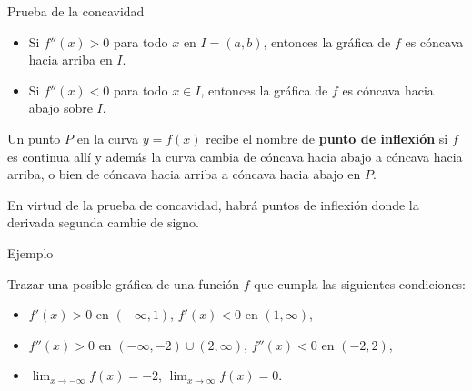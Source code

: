 \documentclass[
  letterpaper,
]{book}
\theoremstyle{plain}
\theoremstyle{remark}
\begin{document}
\label{teo-prueba-concavidad}
Prueba de la concavidad

\begin{itemize}
\item
  Si \(f''(x)>0\) para todo \(x\) en \(I=(a,b)\), entonces la gráfica de
  \(f\) es cóncava hacia arriba en \(I\).
\item
  Si \(f''(x)<0\) para todo \(x\in I\), entonces la gráfica de \(f\) es
  cóncava hacia abajo sobre \(I\).
\end{itemize}

\begin{tcolorbox}[enhanced jigsaw, opacityback=0, left=2mm, opacitybacktitle=0.6, toprule=.15mm, bottomrule=.15mm, colbacktitle=quarto-callout-note-color!10!white, titlerule=0mm, bottomtitle=1mm, title=\textcolor{quarto-callout-note-color}{\faInfo}\hspace{0.5em}{Definición (Punto de inflexión)}, toptitle=1mm, colframe=quarto-callout-note-color-frame, colback=white, breakable, rightrule=.15mm, arc=.35mm, leftrule=.75mm, coltitle=black]

Un punto \(P\) en la curva \(y=f(x)\) recibe el nombre de \textbf{punto
de inflexión} si \(f\) es continua allí y además la curva cambia de
cóncava hacia abajo a cóncava hacia arriba, o bien de cóncava hacia
arriba a cóncava hacia abajo en \(P\).

\end{tcolorbox}

En virtud de la prueba de concavidad, habrá puntos de inflexión donde la
derivada segunda cambie de signo.

Ejemplo

Trazar una posible gráfica de una función \(f\) que cumpla las
siguientes condiciones:

\begin{itemize}
\item
  \(f'(x)>0\) en \((-\infty,1)\), \(f'(x)<0\) en \((1,\infty)\),
\item
  \(f''(x)>0\) en \((-\infty,-2) \cup (2,\infty)\), \(f''(x)<0\) en
  \((-2,2)\),
\item
  \(\displaystyle \lim_{x\to -\infty} f(x)=-2\),
  \(\displaystyle \lim_{x\to \infty} f(x)=0\).
\end{itemize}
\end{document}
